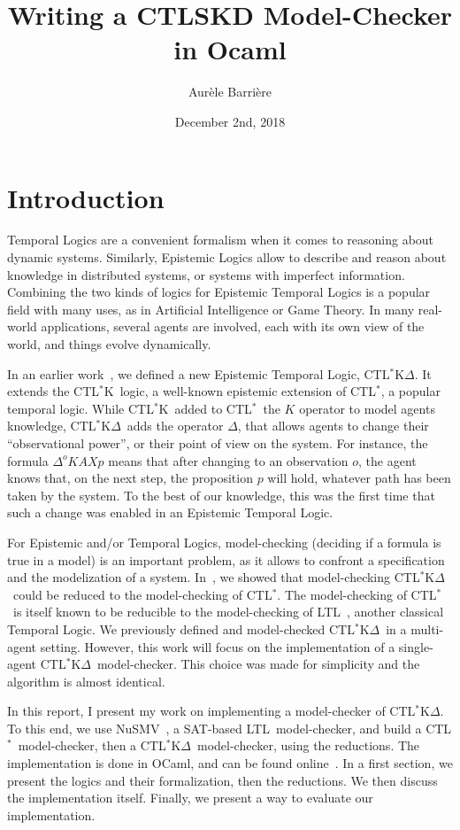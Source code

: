 \documentclass[dvipsnames]{acmart}
\title{Writing a CTLSKD Model-Checker in Ocaml}
\author{Aur\`ele Barri\`ere}
\date{December 2nd, 2018}
\def\ctls{CTL$^{*}$}
\def\ctlsk{CTL$^{*}$K}
\def\ctlskd{CTL$^{*}$K$\Delta$}
\def\ltl{LTL}
\def\A{\mathit{A}}
\def\X{\mathit{X}}
\def\K{\mathit{K}}
\def\D#1{\Delta^{#1}}
\begin{document}
\maketitle

\section{Introduction}

Temporal Logics are a convenient formalism when it comes to reasoning about dynamic systems.
Similarly, Epistemic Logics allow to describe and reason about knowledge in distributed systems, or systems with imperfect information.
Combining the two kinds of logics for Epistemic Temporal Logics is a popular field with many uses, as in Artificial Intelligence or Game Theory.
In many real-world applications, several agents are involved, each with its own view of the world, and things evolve dynamically.

In an earlier work~\cite{internship}, we defined a new Epistemic Temporal Logic, \ctlskd.
It extends the \ctlsk\ logic, a well-known epistemic extension of \ctls, a popular temporal logic.
While \ctlsk\ added to \ctls\ the $\K$ operator to model agents knowledge, \ctlskd\ adds the operator $\Delta$, that allows agents to change their ``observational power'', or their point of view on the system.
For instance, the formula $\D{o}\K\A\X p$ means that after changing to an observation $o$, the agent knows that, on the next step, the proposition $p$ will hold, whatever path has been taken by the system.
To the best of our knowledge, this was the first time that such a change was enabled in an Epistemic Temporal Logic.

For Epistemic and/or Temporal Logics, model-checking (deciding if a formula is true in a model) is an important problem, as it allows to confront a specification and the modelization of a system.
In~\cite{internship}, we showed that model-checking \ctlskd\ could be reduced to the model-checking of \ctls. The model-checking of \ctls\ is itself known to be reducible to the model-checking of \ltl ~\cite{reduction}, another classical Temporal Logic.
We previously defined and model-checked \ctlskd\ in a multi-agent setting. However, this work will focus on the implementation of a single-agent \ctlskd\ model-checker. This choice was made for simplicity and the algorithm is almost identical.

In this report, I present my work on implementing a model-checker of \ctlskd. To this end, we use NuSMV~\cite{nusmv_paper}, a SAT-based \ltl\ model-checker, and build a \ctls\ model-checker, then a  \ctlskd\ model-checker, using the reductions.
The implementation is done in OCaml, and can be found online~\cite{ctlskd_mc}. In a first section, we present the logics and their formalization, then the reductions. We then discuss the implementation itself. Finally, we present a way to evaluate our implementation.
\end{document}
